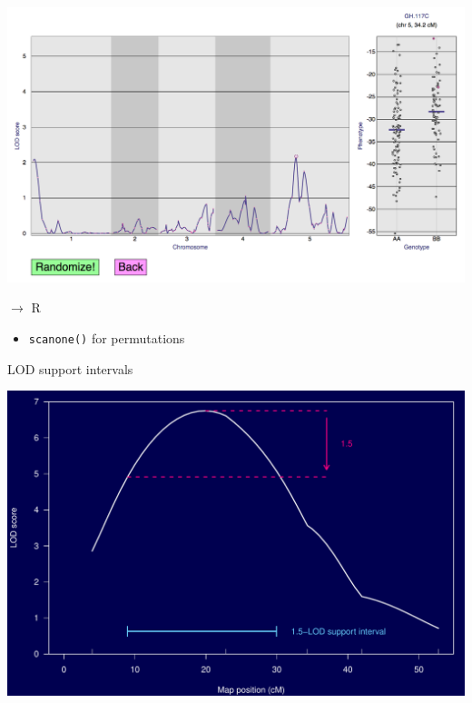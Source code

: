 \documentclass[12pt]{article}
\newcommand{\headsize}{\fontsize{35}{35} \selectfont}
\newcommand{\smallsize}{\fontsize{25}{30} \selectfont}
\begin{document}
\centerline{\href{http://www.biostat.wisc.edu/~kbroman/D3/lod_random}{\includegraphics[width=10in]{Figs/interactive_perm_test.png}}}

\vspace*{1cm}




\newpage

\headsize \color{myyellow}
$\boldsymbol{\rightarrow}$ R

\vspace{3cm}

\color{mywhite} \smallsize

\hfill \begin{minipage}[t]{9.5in}
\begin{itemize}
\itemsep24pt
\item \verb|scanone()| for permutations
\end{itemize} \end{minipage}








\newpage

\headsize \color{myyellow}
\hfill \begin{minipage}{5.75in}
\centering
LOD support intervals
\end{minipage}

\vfill

\centerline{\includegraphics{Figs/lodsuppint.pdf}}
\end{document}
